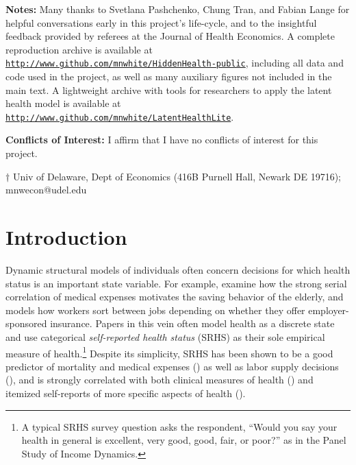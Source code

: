\documentclass[12pt,pdftex,letterpaper]{article}
\begin{document}
\vspace{0.5cm}
\begin{singlespace}
	\noindent \textbf{Notes:} Many thanks to Svetlana Pashchenko, Chung Tran, and Fabian Lange for helpful conversations early in this project's life-cycle, and to the insightful feedback provided by referees at the Journal of Health Economics. A complete reproduction archive is available at \href{http://www.github.com/mnwhite/HiddenHealth-public}{\texttt{http://www.github.com/mnwhite/HiddenHealth-public}}, including all data and code used in the project, as well as many auxiliary figures not included in the main text. A lightweight archive with tools for researchers to apply the latent health model is available at \href{http://www.github.com/mnwhite/LatentHealthLite}{\texttt{http://www.github.com/mnwhite/LatentHealthLite}}.
	
	\vspace{0.5cm}
	
	\noindent \textbf{Conflicts of Interest:} I affirm that I have no conflicts of interest for this project.
	
	\vspace{0.5cm}
	
	\small
	\noindent $\dagger$ Univ of Delaware, Dept of Economics (416B Purnell Hall, Newark DE 19716);  mnwecon@udel.edu
\end{singlespace}


\thispagestyle{empty}

\newpage


\newlength{\TableWidth}

\section{Introduction}\label{sec:Intro}

Dynamic structural models of individuals often concern decisions for which health status is an important state variable.  For example, \cite{DeNardi10} examine how the strong serial correlation of medical expenses motivates the saving behavior of the elderly, and \cite{Aizawa19} models how workers sort between jobs depending on whether they offer employer-sponsored insurance.  Papers in this vein often model health as a discrete state and use categorical \textit{self-reported health status} (SRHS) as their sole empirical measure of health.\footnote{A typical SRHS survey question asks the respondent, ``Would you say your health in general is excellent, very good, good, fair, or poor?'' as in the Panel Study of Income Dynamics.}  Despite its simplicity, SRHS has been shown to be a good predictor of mortality and medical expenses (\cite{Idler97}) as well as labor supply decisions (\cite{Bound91}), and is strongly correlated with both clinical measures of health (\cite{LaRue79}) and itemized self-reports of more specific aspects of health (\cite{Blundell17}).
\end{document}

